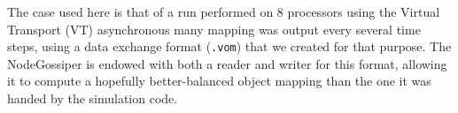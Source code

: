 The case used here is that of a run performed on 8 processors using
the \textsf{Virtual Transport} (\textsf{VT}) asynchronous many
mapping was output every several time steps, using a data exchange
format (\texttt{.vom}) that we created for that purpose.
The \textsf{NodeGossiper} is endowed with both a reader and writer for
this format, allowing it to compute a hopefully better-balanced object
mapping than the one it was handed by the simulation code.
